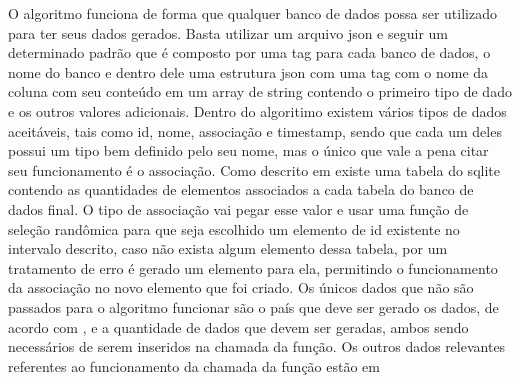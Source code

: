 \documentclass[
	12pt,				%
	openright,			%
	oneside,			%
	a4paper,			%
	english,			%
	french,				%
	spanish,			%
	brazil,				%
	]{abntex2}
\begin{document}
O algoritmo funciona de forma que qualquer banco de dados possa ser utilizado para ter seus dados gerados.
Basta utilizar um arquivo json e seguir um determinado padrão que é composto por uma tag para cada banco de dados,
o nome do banco e dentro dele uma estrutura json com uma tag com o nome da coluna com seu conteúdo em um array de string contendo o primeiro tipo de dado e os outros valores adicionais.\newline
Dentro do algoritimo existem vários tipos de dados aceitáveis, tais como id, nome, associação e timestamp,
sendo que cada um deles possui um tipo bem definido pelo seu nome, mas o único que vale a pena citar seu funcionamento é o associação.
Como descrito em  existe uma tabela do sqlite contendo as quantidades de elementos associados a cada tabela do banco de dados final.
O tipo de associação vai pegar esse valor e usar uma função de seleção randômica para que seja escolhido um elemento de id existente no intervalo descrito,
caso não exista algum elemento dessa tabela, por um tratamento de erro é gerado um elemento para ela, permitindo o funcionamento da associação no novo elemento que foi criado.\newline
Os únicos dados que não são passados para o algoritmo funcionar são o país que deve ser gerado os dados, de acordo com ,
e a quantidade de dados que devem ser geradas, ambos sendo necessários de serem inseridos na chamada da função.
Os outros dados relevantes referentes ao funcionamento da chamada da função estão em 
\end{document}
